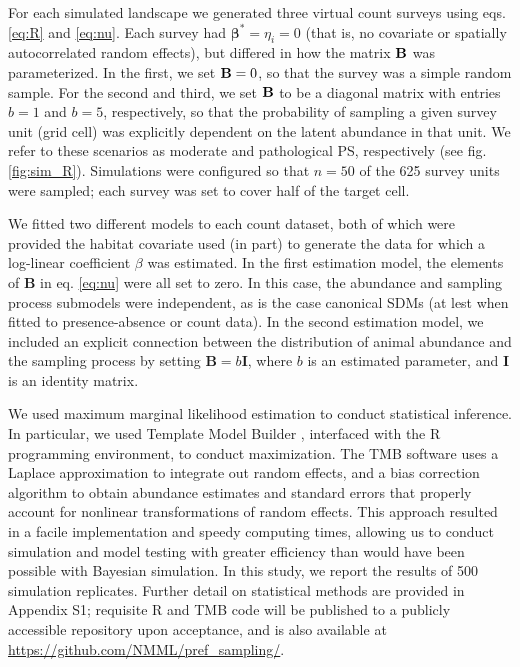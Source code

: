 \documentclass[times,mee,doublespace,]{besauth2}
\begin{document}
For each simulated landscape we generated three virtual count surveys using eqs. \ref{eq:R} and \ref{eq:nu}.  Each survey had $\boldsymbol{\beta}^*=\eta_i=0$ (that is, no covariate or spatially autocorrelated random effects), but differed in how the matrix ${\bf B}$ was parameterized.  In the first, we set ${\bf B}=0$, so that the survey was a simple random sample.  For the second and third, we set ${\bf B}$ to be a diagonal matrix with entries $b=1$ and $b=5$, respectively, so that the probability of sampling a given survey unit (grid cell) was explicitly dependent on the latent abundance in that unit.  We refer to these scenarios as moderate and pathological PS, respectively (see fig. \ref{fig:sim_R}).  Simulations were configured so that $n=50$ of the 625 survey units were sampled; each survey was set to cover half of the target cell.

We fitted two different models to each count dataset, both of which were provided the habitat covariate used (in part) to generate the data for which a log-linear coefficient $\beta$ was estimated.  In the first estimation model, the elements of \textbf{B} in eq. \ref{eq:nu} were all set to zero.  In this case, the abundance and sampling process submodels were independent, as is the case canonical SDMs (at lest when fitted to presence-absence or count data).  In the second estimation model, we included an explicit connection between the distribution of animal abundance and the sampling process by setting $\textbf{B}=b\textbf{I}$, where $b$ is an estimated parameter, and \textbf{I} is an identity matrix.

We used maximum marginal likelihood estimation to conduct statistical inference. In particular, we used Template Model Builder \citep[TMB; ][]{KristensenEtAl2015}, interfaced with the R programming environment, to conduct maximization. The TMB software uses a Laplace approximation to integrate out random effects, and a bias correction algorithm \citep{TierneyEtAl1989,ThorsonKristensenInPress} to obtain abundance estimates and standard errors that properly account for nonlinear transformations of random effects.  This approach resulted in a facile implementation and speedy computing times, allowing us to conduct simulation and model testing with greater efficiency than would have been possible with Bayesian simulation.  In this study, we report the results of 500 simulation replicates.  Further detail on statistical methods are provided in Appendix S1; requisite R and TMB code will be published to a publicly accessible repository upon acceptance, and is also available at \url{https://github.com/NMML/pref_sampling/}.
\end{document}
